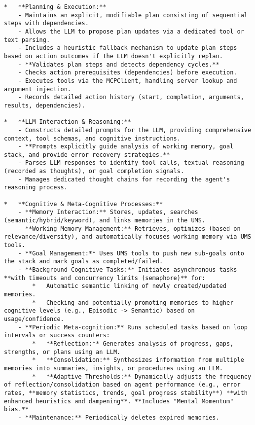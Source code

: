 \documentclass[12pt,a4paper]{article}
\begin{document}
\begin{pageablecode}
\begin{verbatim}
*   **Planning & Execution:**
    - Maintains an explicit, modifiable plan consisting of sequential steps with dependencies.
    - Allows the LLM to propose plan updates via a dedicated tool or text parsing.
    - Includes a heuristic fallback mechanism to update plan steps based on action outcomes if the LLM doesn't explicitly replan.
    - **Validates plan steps and detects dependency cycles.**
    - Checks action prerequisites (dependencies) before execution.
    - Executes tools via the MCPClient, handling server lookup and argument injection.
    - Records detailed action history (start, completion, arguments, results, dependencies).

*   **LLM Interaction & Reasoning:**
    - Constructs detailed prompts for the LLM, providing comprehensive context, tool schemas, and cognitive instructions.
    - **Prompts explicitly guide analysis of working memory, goal stack, and provide error recovery strategies.**
    - Parses LLM responses to identify tool calls, textual reasoning (recorded as thoughts), or goal completion signals.
    - Manages dedicated thought chains for recording the agent's reasoning process.

*   **Cognitive & Meta-Cognitive Processes:**
    - **Memory Interaction:** Stores, updates, searches (semantic/hybrid/keyword), and links memories in the UMS.
    - **Working Memory Management:** Retrieves, optimizes (based on relevance/diversity), and automatically focuses working memory via UMS tools.
    - **Goal Management:** Uses UMS tools to push new sub-goals onto the stack and mark goals as completed/failed.
    - **Background Cognitive Tasks:** Initiates asynchronous tasks **with timeouts and concurrency limits (semaphore)** for:
        *   Automatic semantic linking of newly created/updated memories.
        *   Checking and potentially promoting memories to higher cognitive levels (e.g., Episodic -> Semantic) based on usage/confidence.
    - **Periodic Meta-cognition:** Runs scheduled tasks based on loop intervals or success counters:
        *   **Reflection:** Generates analysis of progress, gaps, strengths, or plans using an LLM.
        *   **Consolidation:** Synthesizes information from multiple memories into summaries, insights, or procedures using an LLM.
        *   **Adaptive Thresholds:** Dynamically adjusts the frequency of reflection/consolidation based on agent performance (e.g., error rates, **memory statistics, trends, goal progress stability**) **with enhanced heuristics and dampening**. **Includes "Mental Momentum" bias.**
    - **Maintenance:** Periodically deletes expired memories.


\end{verbatim}
\end{pageablecode}
\end{document}

